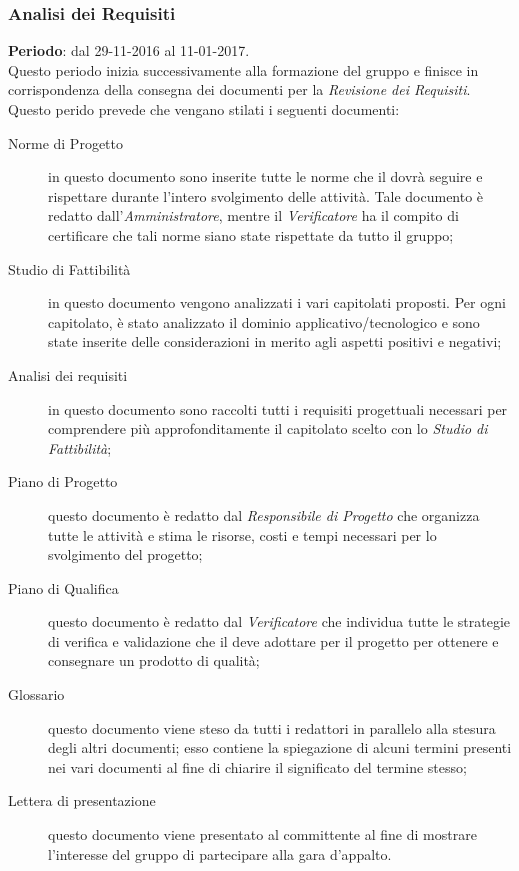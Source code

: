 	\subsubsection{Analisi dei Requisiti} \label{sec:AR}
	\textbf{Periodo}: dal 29-11-2016 al 11-01-2017.
	\\ Questo periodo inizia successivamente alla formazione del gruppo e finisce in corrispondenza della consegna dei documenti per la \emph{Revisione dei Requisiti}.
	Questo perido prevede che vengano stilati i seguenti documenti:
	\begin{description}
		\item[Norme di Progetto] in questo documento sono inserite tutte le norme che il  dovrà seguire e rispettare durante l'intero svolgimento delle attività. Tale documento è redatto dall'\emph{Amministratore}, mentre il \emph{Verificatore} ha il compito di certificare che tali norme siano state rispettate da tutto il gruppo;
		\item[Studio di Fattibilità] in questo documento vengono analizzati i vari capitolati proposti. Per ogni capitolato, è stato analizzato il dominio applicativo/tecnologico e sono state inserite delle considerazioni in merito agli aspetti positivi e negativi;
		\item[Analisi dei requisiti] in questo documento sono raccolti tutti i requisiti progettuali necessari per comprendere più approfonditamente	il capitolato scelto con lo \emph{Studio di Fattibilità};
		\item[Piano di Progetto] questo documento è redatto dal \emph{Responsibile di Progetto} che organizza tutte le attività e stima le risorse, costi e tempi necessari per lo svolgimento del progetto;
		\item[Piano di Qualifica] questo documento è redatto dal \emph{Verificatore} che individua tutte le strategie di verifica e validazione che il  deve adottare per il progetto per ottenere e consegnare un prodotto di qualità;
		\item[Glossario] questo documento viene steso da tutti i redattori in parallelo alla stesura degli altri documenti; esso contiene la spiegazione di alcuni termini presenti nei vari documenti al fine di chiarire il significato del termine stesso;
		\item[Lettera di presentazione] questo documento viene presentato al committente al fine di mostrare l'interesse del gruppo di partecipare alla gara d'appalto.
	\end{description}
	
